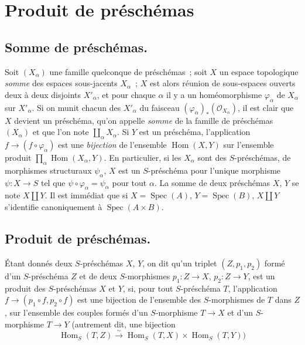 \section{Produit de préschémas}
\label{section:I.3-fr}

\subsection{Somme de préschémas.}
\label{subsection:I.3.1-fr}

\label{I.3.1.1-fr}
Soit $(X_\alpha)$ une famille quelconque de préschémas~; soit $X$ un espace
topologique \emph{somme} des espaces sous-jacents $X_\alpha$~; $X$ est alors
réunion de sous-espaces ouverts deux à deux disjoints $X'_\alpha$, et pour
chaque $\alpha$ il y a un homéomorphisme $\varphi_\alpha$ de $X_\alpha$ sur
$X'_\alpha$. Si on munit chacun des $X'_\alpha$ du faisceau
$(\varphi_\alpha)_*(\mathscr{O}_{X_\alpha})$, il est clair que $X$ devient un
préschéma, qu'on appelle \emph{somme} de la famille de préschémas $(X_\alpha)$
et que l'on note $\coprod_\alpha X_\alpha$. Si $Y$ est un préschéma,
l'application $f\to(f\circ\varphi_\alpha)$ est une \emph{bijection} de
l'ensemble $\operatorname{Hom}(X,Y)$ sur l'ensemble produit
$\prod_\alpha\operatorname{Hom}(X_\alpha,Y)$. En particulier, si les
$X_\alpha$ sont des $S$-préschémas, de morphismes structuraux $\psi_\alpha$,
$X$ est un $S$-préschéma pour l'unique morphisme $\psi:X\to S$ tel que
$\psi\circ\varphi_\alpha=\psi_\alpha$ pour tout $\alpha$. La somme de deux
préschémas $X$, $Y$ se note $X\amalg Y$. Il est immédiat que si
$X=\operatorname{Spec}(A)$, $Y=\operatorname{Spec}(B)$, $X\amalg Y$
s'identifie canoniquement à $\operatorname{Spec}(A\times B)$.

\subsection{Produit de préschémas.}
\label{subsection:I.3.2-fr}

\begin{definition}[3.2.1]
\label{I.3.2.1-fr}
Étant donnés deux $S$-préschémas $X$, $Y$, on dit qu'un triplet
$(Z,p_1,p_2)$ formé d'un $S$-préschéma $Z$ et de deux $S$-morphismes
$p_1:Z\to X$, $p_2:Z\to Y$, est un produit des
$S$-préschémas $X$ et $Y$, si, pour tout $S$-préschéma $T$, l'application
$f\to(p_1\circ f,p_2\circ f)$ est une bijection de l'ensemble des
$S$-morphismes de $T$ dans $Z$, sur l'ensemble des couples formés d'un
$S$-morphisme $T\to X$ et d'un $S$-morphisme $T\to Y$ \textup{(autrement dit, une
bijection}
\[
  \operatorname{Hom}_S(T,Z)\xrightarrow{\sim}
  \operatorname{Hom}_S(T,X)\times\operatorname{Hom}_S(T,Y))
\]
\end{definition}

